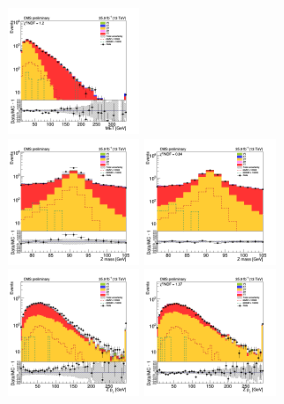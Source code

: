 \begin{figure}[tbp]
\begin{center}
    \includegraphics[width=0.31\textwidth]{figures/mm_300_april18/met_pt_mm_CRDY_FullPostfit_plot_apr18.png}\\
    \includegraphics[width=0.31\textwidth]{figures/mm_300_april18/zmass_mm_CRDY_prefit_plot_apr21.png}
    \includegraphics[width=0.31\textwidth]{figures/mm_300_april18/zmass_mm_CRDY_FullPostfit_plot_apr21.png}\\
    \includegraphics[width=0.31\textwidth]{figures/mm_300_april18/zpt0_mm_CRDY_prefit_plot_apr18.png}
    \includegraphics[width=0.31\textwidth]{figures/mm_300_april18/zpt0_mm_CRDY_FullPostfit_plot_apr18.png}\\

\end{center}
\end{figure}
